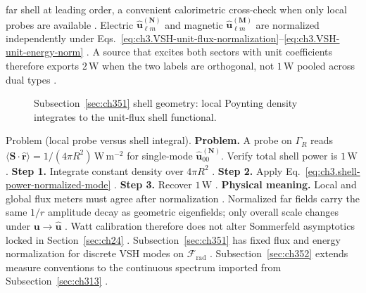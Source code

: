 far shell at leading order, a convenient calorimetric cross-check when only local probes are available
\cite{harrington2001}.
Electric \(\widehat{\mathbf{u}}_{\ell m}^{(\mathbf{N})}\) and magnetic \(\widehat{\mathbf{u}}_{\ell m}^{(\mathbf{M})}\) are
normalized independently under Eqs.~\eqref{eq:ch3.VSH-unit-flux-normalization}--\eqref{eq:ch3.VSH-unit-energy-norm}
\cite{belinfante1940}. A source that excites both sectors with unit coefficients therefore exports
\(2\,\mathrm{W}\) when the two labels are orthogonal, not \(1\,\mathrm{W}\) pooled across dual types
\cite{harrington2001}.
\begin{figure}[t]
\centering
{}
\caption{Subsection~\ref{sec:ch351} shell geometry: local Poynting density integrates to the unit-flux shell functional.}
\label{fig:ch3.351-shell-density}
\end{figure}
Problem (local probe versus shell integral). \textbf{Problem.} A probe on \(\Gamma_R\) reads \(\langle\mathbf{S}\cdot\hat{\mathbf{r}}\rangle=1/(4\pi R^{2})\,\mathrm{W\,m^{-2}}\)
for single-mode \(\widehat{\mathbf{u}}_{00}^{(\mathbf{N})}\). Verify total shell power is \(1\,\mathrm{W}\)
\cite{poynting1884}.
\textbf{Step 1.} Integrate constant density over \(4\pi R^{2}\) \cite{jackson1999}.
\textbf{Step 2.} Apply Eq.~\eqref{eq:ch3.shell-power-normalized-mode} \cite{harrington2001}.
\textbf{Step 3.} Recover \(1\,\mathrm{W}\) \cite{stratton1941}.
\textbf{Physical meaning.} Local and global flux meters must agree after normalization \cite{poynting1884}.
Normalized far fields carry the same \(1/r\) amplitude decay as geometric eigenfields; only overall scale changes under
\(\mathbf{u}\to\widehat{\mathbf{u}}\) \cite{stratton1941}. Watt calibration therefore does not alter
Sommerfeld asymptotics locked in Section~\ref{sec:ch24} \cite{stratton1941}.
Subsection~\ref{sec:ch351} has fixed flux and energy normalization for discrete VSH modes on
\(\mathcal{F}_{\mathrm{rad}}\) \cite{stratton1941}. Subsection~\ref{sec:ch352} extends
measure conventions to the continuous spectrum imported from Subsection~\ref{sec:ch313} \cite{hansen1988}.
